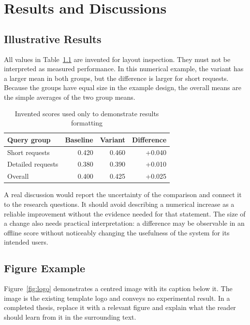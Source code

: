 \chapter{Results and Discussions}
\label{sec:results_and_discussions}

\section{Illustrative Results}
All values in Table~\ref{tab:results} are invented for layout inspection. They
must not be interpreted as measured performance. In this numerical example,
the variant has a larger mean in both groups, but the difference is larger
for short requests. Because the groups have equal size in the example design,
the overall means are the simple averages of the two group means.

\begin{table}[htbp]
  \centering
  \caption{Invented scores used only to demonstrate results formatting}
  \label{tab:results}
  \begin{tabular}{lrrr}\hline
    Query group & Baseline & Variant & Difference\\\hline
    Short requests & 0.420 & 0.460 & +0.040\\
    Detailed requests & 0.380 & 0.390 & +0.010\\
    Overall & 0.400 & 0.425 & +0.025\\\hline
  \end{tabular}
\end{table}

A real discussion would report the uncertainty of the comparison and connect
it to the research questions. It should avoid describing a numerical increase
as a reliable improvement without the evidence needed for that statement.
The size of a change also needs practical interpretation: a difference may
be observable in an offline score without noticeably changing the usefulness
of the system for its intended users.

\clearpage
\section{Figure Example}
Figure~\ref{fig:logo} demonstrates a centred image with its caption below it.
The image is the existing template logo and conveys no experimental result.
In a completed thesis, replace it with a relevant figure and explain what the
reader should learn from it in the surrounding text.

